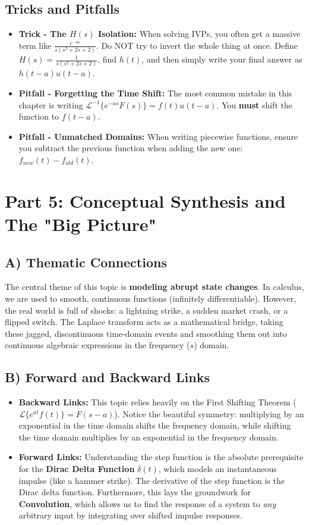 \documentclass[11pt, letterpaper]{article}
\theoremstyle{definition}
\theoremstyle{remark}
\newcommand{\Lap}{\mathcal{L}}
\begin{document}
\subsection{Tricks and Pitfalls}
\begin{itemize}
    \item \textbf{Trick - The $H(s)$ Isolation:} When solving IVPs, you often get a massive term like $\frac{e^{-as}}{s(s^2+2s+2)}$. Do NOT try to invert the whole thing at once. Define $H(s) = \frac{1}{s(s^2+2s+2)}$, find $h(t)$, and then simply write your final answer as $h(t-a)u(t-a)$.
    \item \textbf{Pitfall - Forgetting the Time Shift:} The most common mistake in this chapter is writing $\Lap^{-1}\{e^{-as}F(s)\} = f(t)u(t-a)$. You \textbf{must} shift the function to $f(t-a)$.
    \item \textbf{Pitfall - Unmatched Domains:} When writing piecewise functions, ensure you subtract the previous function when adding the new one: $f_{new}(t) - f_{old}(t)$.
\end{itemize}

\section{Part 5: Conceptual Synthesis and The "Big Picture"}

\subsection{A) Thematic Connections}
The central theme of this topic is \textbf{modeling abrupt state changes}. In calculus, we are used to smooth, continuous functions (infinitely differentiable). However, the real world is full of shocks: a lightning strike, a sudden market crash, or a flipped switch. The Laplace transform acts as a mathematical bridge, taking these jagged, discontinuous time-domain events and smoothing them out into continuous algebraic expressions in the frequency ($s$) domain.

\subsection{B) Forward and Backward Links}
\begin{itemize}
    \item \textbf{Backward Links:} This topic relies heavily on the First Shifting Theorem ($\Lap\{e^{at}f(t)\} = F(s-a)$). Notice the beautiful symmetry: multiplying by an exponential in the time domain shifts the frequency domain, while shifting the time domain multiplies by an exponential in the frequency domain.
    \item \textbf{Forward Links:} Understanding the step function is the absolute prerequisite for the \textbf{Dirac Delta Function} $\delta(t)$, which models an instantaneous impulse (like a hammer strike). The derivative of the step function is the Dirac delta function. Furthermore, this lays the groundwork for \textbf{Convolution}, which allows us to find the response of a system to \textit{any} arbitrary input by integrating over shifted impulse responses.
\end{itemize}
\end{document}
